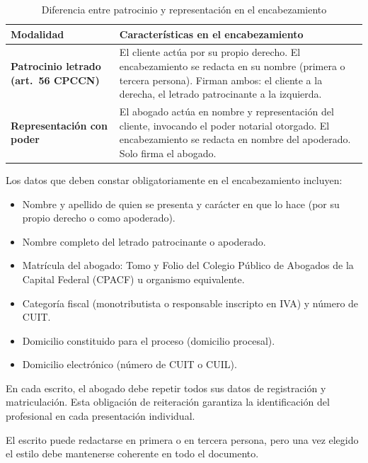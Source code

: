 \documentclass[12pt,oneside]{book}
\begin{document}
\begin{table}[H]
\centering
\caption{Diferencia entre patrocinio y representación en el encabezamiento}
\begin{tabularx}{\textwidth}{>{\bfseries}lX}
\toprule
Modalidad & Características en el encabezamiento \\
\midrule
Patrocinio letrado (art.\ 56 CPCCN) &
El cliente actúa por su propio derecho. El encabezamiento se redacta en su nombre (primera o tercera persona). Firman ambos: el cliente a la derecha, el letrado patrocinante a la izquierda. \\
\addlinespace
Representación con poder &
El abogado actúa en nombre y representación del cliente, invocando el poder notarial otorgado. El encabezamiento se redacta en nombre del apoderado. Solo firma el abogado. \\
\bottomrule
\end{tabularx}
\end{table}

Los datos que deben constar obligatoriamente en el encabezamiento incluyen:

\begin{itemize}
    \item Nombre y apellido de quien se presenta y carácter en que lo hace (por su propio derecho o como apoderado).
    \item Nombre completo del letrado patrocinante o apoderado.
    \item Matrícula del abogado: Tomo y Folio del Colegio Público de Abogados de la Capital Federal (CPACF) u organismo equivalente.
    \item Categoría fiscal (monotributista o responsable inscripto en IVA) y número de CUIT.
    \item Domicilio constituido para el proceso (domicilio procesal).
    \item Domicilio electrónico (número de CUIT o CUIL).
\end{itemize}

\begin{important}
En cada escrito, el abogado debe repetir todos sus datos de registración y matriculación. Esta obligación de reiteración garantiza la identificación del profesional en cada presentación individual.
\end{important}

El escrito puede redactarse en primera o en tercera persona, pero una vez elegido el estilo debe mantenerse coherente en todo el documento.
\end{document}

